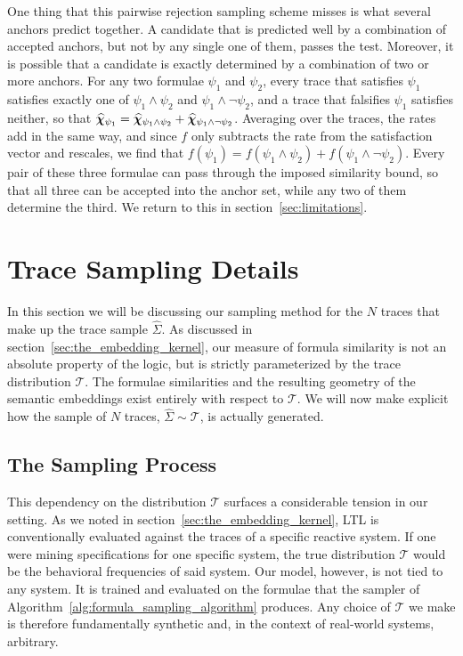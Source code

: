 \documentclass[titlepage,a4paper,11pt]{report}
\begin{document}
    One thing that this pairwise rejection sampling scheme misses is what several anchors predict together. A candidate that is predicted well by a combination of accepted anchors, but not by any single one of them, passes the test. Moreover, it is possible that a candidate is exactly determined by a combination of two or more anchors. For any two formulae $\psi_1$ and $\psi_2$, every trace that satisfies $\psi_1$ satisfies exactly one of $\psi_1\land\psi_2$ and $\psi_1\land\neg\psi_2$, and a trace that falsifies $\psi_1$ satisfies neither, so that $\bm{\widehat\chi}_{\psi_1}=\bm{\widehat\chi}_{\psi_1\land\psi_2}+\bm{\widehat\chi}_{\psi_1\land\neg\psi_2}$. Averaging over the traces, the rates add in the same way, and since $f$ only subtracts the rate from the satisfaction vector and rescales, we find that $f(\psi_1)=f(\psi_1\land\psi_2)+f(\psi_1\land\neg\psi_2)$. Every pair of these three formulae can pass through the imposed similarity bound, so that all three can be accepted into the anchor set, while any two of them determine the third. We return to this in section~\ref{sec:limitations}.

    
    \section{Trace Sampling Details} \label{sec:trace_sampling_details}
    In this section we will be discussing our sampling method for the $N$ traces that make up the trace sample $\widehat \Sigma$. As discussed in section~\ref{sec:the_embedding_kernel}, our measure of formula similarity is not an absolute property of the logic, but is strictly parameterized by the trace distribution $\mathcal{T}$. The formulae similarities and the resulting geometry of the semantic embeddings exist entirely with respect to $\mathcal{T}$. We will now make explicit how the sample of $N$ traces, $\widehat\Sigma \sim \mathcal{T}$, is actually generated.
 
    \subsection{The Sampling Process}\label{sec:sampling_process}
    This dependency on the distribution $\mathcal{T}$ surfaces a considerable tension in our setting. As we noted in section~\ref{sec:the_embedding_kernel}, LTL is conventionally evaluated against the traces of a specific reactive system. If one were mining specifications for one specific system, the true distribution $\mathcal{T}$ would be the behavioral frequencies of said system. Our model, however, is not tied to any system. It is trained and evaluated on the formulae that the sampler of Algorithm~\ref{alg:formula_sampling_algorithm} produces. Any choice of $\mathcal{T}$ we make is therefore fundamentally synthetic and, in the context of real-world systems, arbitrary.
 
\end{document}
